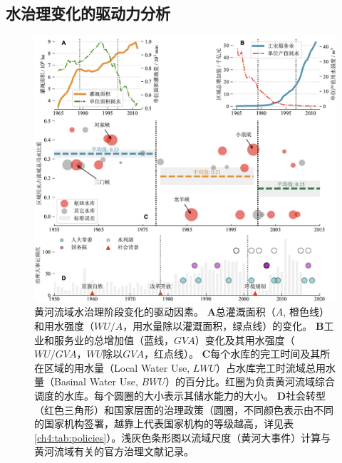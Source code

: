 




\subsection{水治理变化的驱动力分析}\label{ch4:sec:mechanism}

\begin{figure}[th!]
	\centering
	\includegraphics[width=\textwidth]{img/ch4/ch4_causes.png}
	\caption[黄河流域水治理阶段变化的驱动因素]{
		黄河流域水治理阶段变化的驱动因素。
		\textbf{A}总灌溉面积（$A$, 橙色线）和用水强度（$WU/A$，用水量除以灌溉面积，绿点线）的变化。
        \textbf{B}工业和服务业的总增加值（蓝线，$GVA$）变化及其用水强度（$WU/GVA$，$WU$除以$GVA$，红点线）。
        \textbf{C}每个水库的完工时间及其所在区域的用水量（Local Water Use, $LWU$）占水库完工时流域总用水量（Basinal Water Use, $BWU$）的百分比。红圈为负责黄河流域综合调度的水库。每个圆圈的大小表示其储水能力的大小。
        \textbf{D}社会转型（红色三角形）和国家层面的治理政策（圆圈，不同颜色表示由不同的国家机构签署，越靠上代表国家机构的等级越高，详见表\ref{ch4:tab:policies}）。浅灰色条形图以流域尺度（黄河大事件）计算与黄河流域有关的官方治理文献记录。}\label{ch4:fig:mechanism}
\end{figure}


